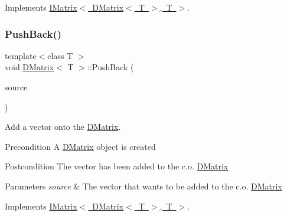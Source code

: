 Implements \mbox{\hyperlink{class_i_matrix_a1ed62ee6700728045083c7f0df3e3e62}{I\+Matrix$<$ D\+Matrix$<$ T $>$, T $>$}}.

\mbox{\label{class_d_matrix_ad810420fa5ae11470778e4805c0df1c9}} 
\subsubsection{\texorpdfstring{PushBack()}{PushBack()}}
{\footnotesize\ttfamily template$<$class T $>$ \\
void \mbox{\hyperlink{class_d_matrix}{D\+Matrix}}$<$ T $>$\+::Push\+Back (\begin{DoxyParamCaption}\item[{const \mbox{\hyperlink{class_my_vector}{My\+Vector}}$<$ T $>$ \&}]{source }\end{DoxyParamCaption})\hspace{0.3cm}{\ttfamily [virtual]}}



Add a vector onto the \mbox{\hyperlink{class_d_matrix}{D\+Matrix}}. 

\begin{DoxyPrecond}{Precondition}
A \mbox{\hyperlink{class_d_matrix}{D\+Matrix}} object is created 
\end{DoxyPrecond}
\begin{DoxyPostcond}{Postcondition}
The vector has been added to the c.\+o. \mbox{\hyperlink{class_d_matrix}{D\+Matrix}}
\end{DoxyPostcond}

\begin{DoxyParams}{Parameters}
{\em source} & The vector that wants to be added to the c.\+o. \mbox{\hyperlink{class_d_matrix}{D\+Matrix}} \\
\hline
\end{DoxyParams}


Implements \mbox{\hyperlink{class_i_matrix_aa5de147c7aa5b74b0f2177ed1a8158de}{I\+Matrix$<$ D\+Matrix$<$ T $>$, T $>$}}.

\mbox{\label{class_d_matrix_ad7521c1d7b1b3b1faf30be6612a829f0}} 
